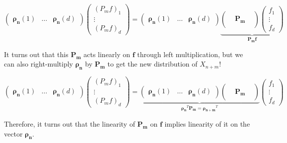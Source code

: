 \documentclass{article}
\begin{document}
\begin{example}
      \[\begin{pmatrix} \boldsymbol{\rho_n} (1) & \ldots & \boldsymbol{\rho_n} (d) \end{pmatrix} \begin{pmatrix} (P_m f)_1 \\ \vdots \\(P_m f)_d \end{pmatrix} = \begin{pmatrix} \boldsymbol{\rho_n} (1) & \ldots & \boldsymbol{\rho_n} (d) \end{pmatrix} \underbrace{\begin{pmatrix} && \\ & \mathbf{P_m} & \\ && \end{pmatrix} \begin{pmatrix} f_1 \\ \vdots \\ f_d \end{pmatrix}}_{\mathbf{P_m f}}\]

    It turns out that this $\mathbf{P_m}$ acts linearly on $\mathbf{f}$ through left multiplication, but we can also right-multiply $\boldsymbol{\rho_n}$ by $\mathbf{P_m}$ to get the new distribution of $X_{n + m}$! 

      \[\begin{pmatrix} \boldsymbol{\rho_n} (1) & \ldots & \boldsymbol{\rho_n} (d) \end{pmatrix} \begin{pmatrix} (P_m f)_1 \\ \vdots \\(P_m f)_d \end{pmatrix} = \underbrace{\begin{pmatrix} \boldsymbol{\rho_n} (1) & \ldots & \boldsymbol{\rho_n} (d) \end{pmatrix} \begin{pmatrix} && \\ & \mathbf{P_m} & \\ && \end{pmatrix}}_{\boldsymbol{\rho_n}^T \mathbf{P_m} = \boldsymbol{\rho_{n+m}}^T} \begin{pmatrix} f_1 \\ \vdots \\ f_d \end{pmatrix}\]

    Therefore, it turns out that the linearity of $\mathbf{P_m}$ on $\mathbf{f}$ implies linearity of it on the vector $\boldsymbol{\rho_n}$. 
  \end{example}
\end{document}
